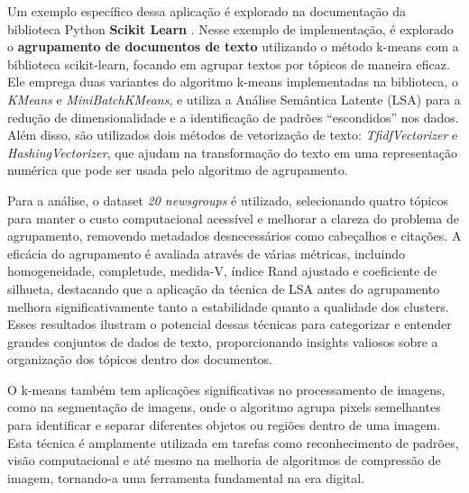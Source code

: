 \documentclass[12pt,
openright, 
oneside, %
a4paper,    %
brazil]{facom-ufu-abntex2}
\begin{document}
Um exemplo específico dessa aplicação é explorado na documentação da biblioteca Python \textbf{Scikit Learn} \cite{kMeansDocClustering2024}. Nesse exemplo de implementação, é explorado o \textbf{agrupamento de documentos de texto} utilizando o método k-means com a biblioteca scikit-learn, focando em agrupar textos por tópicos de maneira eficaz. Ele emprega duas variantes do algoritmo k-means implementadas na biblioteca, o \textit{KMeans} e \textit{MiniBatchKMeans}, e utiliza a Análise Semântica Latente (LSA) para a redução de dimensionalidade e a identificação de padrões \enquote{escondidos} nos dados. Além disso, são utilizados dois métodos de vetorização de texto: \textit{TfidfVectorizer} e \textit{HashingVectorizer}, que ajudam na transformação do texto em uma representação numérica que pode ser usada pelo algoritmo de agrupamento.

Para a análise, o dataset \textit{20 newsgroups} é utilizado, selecionando quatro tópicos para manter o custo computacional acessível e melhorar a clareza do problema de agrupamento, removendo metadados desnecessários como cabeçalhos e citações. A eficácia do agrupamento é avaliada através de várias métricas, incluindo homogeneidade, completude, medida-V, índice Rand ajustado e coeficiente de silhueta, destacando que a aplicação da técnica de LSA antes do agrupamento melhora significativamente tanto a estabilidade quanto a qualidade dos clusters. Esses resultados ilustram o potencial dessas técnicas para categorizar e entender grandes conjuntos de dados de texto, proporcionando insights valiosos sobre a organização dos tópicos dentro dos documentos.

O k-means também tem aplicações significativas no processamento de imagens, como na segmentação de imagens, onde o algoritmo agrupa pixels semelhantes para identificar e separar diferentes objetos ou regiões dentro de uma imagem. Esta técnica é amplamente utilizada em tarefas como reconhecimento de padrões, visão computacional e até mesmo na melhoria de algoritmos de compressão de imagem, tornando-a uma ferramenta fundamental na era digital.





\end{document}
